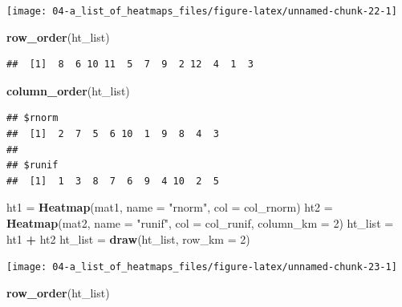 \documentclass[]{book}
\newenvironment{Shaded}{\begin{snugshade}}{\end{snugshade}}
\newcommand{\KeywordTok}[1]{\textcolor[rgb]{0.13,0.29,0.53}{\textbf{#1}}}
\newcommand{\DataTypeTok}[1]{\textcolor[rgb]{0.13,0.29,0.53}{#1}}
\newcommand{\DecValTok}[1]{\textcolor[rgb]{0.00,0.00,0.81}{#1}}
\newcommand{\StringTok}[1]{\textcolor[rgb]{0.31,0.60,0.02}{#1}}
\newcommand{\OperatorTok}[1]{\textcolor[rgb]{0.81,0.36,0.00}{\textbf{#1}}}
\newcommand{\NormalTok}[1]{#1}
\theoremstyle{definition}
\theoremstyle{definition}
\theoremstyle{definition}
\theoremstyle{remark}
\begin{document}
\begin{center}\texttt{[image: 04-a\_list\_of\_heatmaps\_files/figure-latex/unnamed-chunk-22-1]} \end{center}

\begin{Shaded}
\begin{Highlighting}[]
\KeywordTok{row_order}\NormalTok{(ht_list)}
\end{Highlighting}
\end{Shaded}

\begin{verbatim}
##  [1]  8  6 10 11  5  7  9  2 12  4  1  3
\end{verbatim}

\begin{Shaded}
\begin{Highlighting}[]
\KeywordTok{column_order}\NormalTok{(ht_list)}
\end{Highlighting}
\end{Shaded}

\begin{verbatim}
## $rnorm
##  [1]  2  7  5  6 10  1  9  8  4  3
## 
## $runif
##  [1]  1  3  8  7  6  9  4 10  2  5
\end{verbatim}

\begin{Shaded}
\begin{Highlighting}[]
\NormalTok{ht1 =}\StringTok{ }\KeywordTok{Heatmap}\NormalTok{(mat1, }\DataTypeTok{name =} \StringTok{"rnorm"}\NormalTok{, }\DataTypeTok{col =}\NormalTok{ col_rnorm)}
\NormalTok{ht2 =}\StringTok{ }\KeywordTok{Heatmap}\NormalTok{(mat2, }\DataTypeTok{name =} \StringTok{"runif"}\NormalTok{, }\DataTypeTok{col =}\NormalTok{ col_runif, }\DataTypeTok{column_km =} \DecValTok{2}\NormalTok{)}
\NormalTok{ht_list =}\StringTok{ }\NormalTok{ht1 }\OperatorTok{+}\StringTok{ }\NormalTok{ht2}
\NormalTok{ht_list =}\StringTok{ }\KeywordTok{draw}\NormalTok{(ht_list, }\DataTypeTok{row_km =} \DecValTok{2}\NormalTok{)}
\end{Highlighting}
\end{Shaded}

\begin{center}\texttt{[image: 04-a\_list\_of\_heatmaps\_files/figure-latex/unnamed-chunk-23-1]} \end{center}

\begin{Shaded}
\begin{Highlighting}[]
\KeywordTok{row_order}\NormalTok{(ht_list)}
\end{Highlighting}
\end{Shaded}
\end{document}

